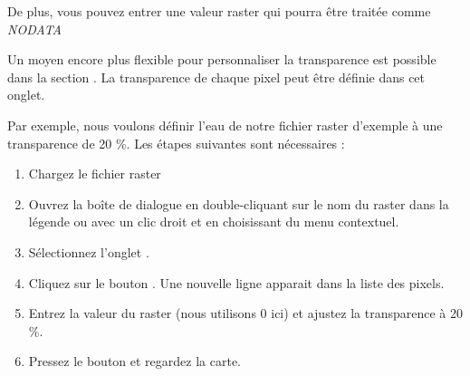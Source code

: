 De plus, vous pouvez entrer une valeur raster qui pourra être traitée comme {\em
NODATA}

Un moyen encore plus flexible pour personnaliser la transparence est possible
dans la section .
La transparence de chaque pixel peut être définie dans cet onglet.

Par exemple, nous voulons définir l'eau de notre fichier raster d'exemple
 à une transparence de 20 \%. Les étapes suivantes sont
nécessaires :
\begin{enumerate}
\item Chargez le fichier raster 
 \item Ouvrez la boîte de dialogue  en double-cliquant sur
le nom du raster dans la légende ou avec un clic droit et en choisissant
 du menu contextuel.
 \item Sélectionnez l'onglet .
  \item \label{enum:add} Cliquez sur le bouton
. Une
nouvelle ligne apparait dans la liste des pixels.
 \item \label{enum:transp} Entrez la valeur du raster (nous utilisons 0 ici)
et ajustez la transparence à 20 \%.
 \item Pressez le bouton  et regardez la carte.
\end{enumerate}

